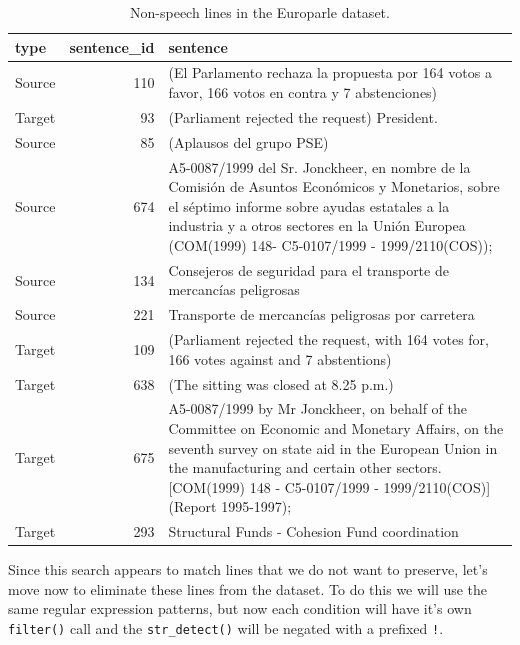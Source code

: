 \documentclass[
  letterpaper,
]{scrbook}
\begin{document}
\hypertarget{tbl-td-europarle-search-non-speech}{}
\begin{table}
\caption{\label{tbl-td-europarle-search-non-speech}Non-speech lines in the Europarle dataset. }\tabularnewline

\centering
\begin{tabular}{lrl}
\toprule
type & sentence\_id & sentence\\
\midrule
Source & 110 & (El Parlamento rechaza la propuesta por 164 votos a favor, 166 votos en contra y 7 abstenciones)\\
Target & 93 & (Parliament rejected the request) President.\\
Source & 85 & (Aplausos del grupo PSE)\\
Source & 674 & A5-0087/1999 del Sr. Jonckheer, en nombre de la Comisión de Asuntos Económicos y Monetarios, sobre el séptimo informe sobre ayudas estatales a la industria y a otros sectores en la Unión Europea (COM(1999) 148- C5-0107/1999 - 1999/2110(COS));\\
Source & 134 & Consejeros de seguridad para el transporte de mercancías peligrosas\\
\addlinespace
Source & 221 & Transporte de mercancías peligrosas por carretera\\
Target & 109 & (Parliament rejected the request, with 164 votes for, 166 votes against and 7 abstentions)\\
Target & 638 & (The sitting was closed at 8.25 p.m.)\\
Target & 675 & A5-0087/1999 by Mr Jonckheer, on behalf of the Committee on Economic and Monetary Affairs, on the seventh survey on state aid in the European Union in the manufacturing and certain other sectors. [COM(1999) 148 - C5-0107/1999 - 1999/2110(COS)] (Report 1995-1997);\\
Target & 293 & Structural Funds - Cohesion Fund coordination\\
\bottomrule
\end{tabular}
\end{table}

Since this search appears to match lines that we do not want to
preserve, let's move now to eliminate these lines from the dataset. To
do this we will use the same regular expression patterns, but now each
condition will have it's own \texttt{filter()} call and the
\texttt{str\_detect()} will be negated with a prefixed \texttt{!}.
\end{document}
